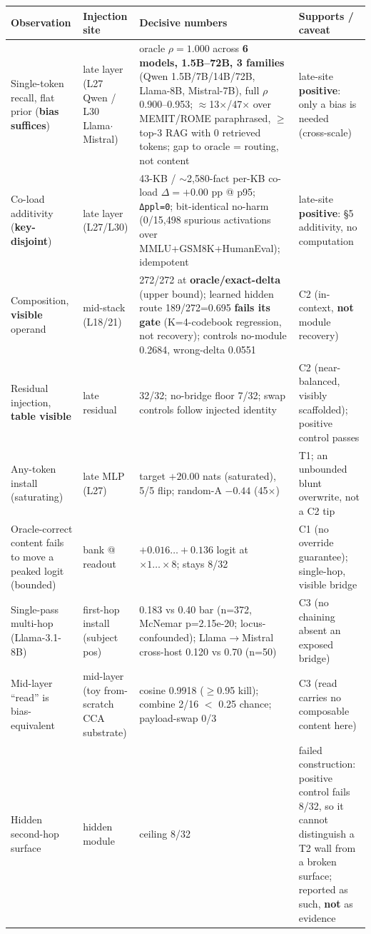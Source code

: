 \documentclass[11pt]{article}
\theoremstyle{plain}
\theoremstyle{definition}
\begin{document}
{\footnotesize
\begin{longtable}{p{2.6cm}p{2.3cm}p{4.8cm}p{2.6cm}}
\toprule
Observation & Injection site & Decisive numbers & Supports / caveat \\
\midrule
\endhead
Single-token recall, flat prior (\textbf{bias suffices}) & late layer (L27 Qwen / L30 Llama$\cdot$Mistral) & oracle $\rho=1.000$ across \textbf{6 models, 1.5B--72B, 3 families} (Qwen 1.5B/7B/14B/72B, Llama-8B, Mistral-7B), full $\rho$ 0.900--0.953; $\approx$13$\times$/47$\times$ over MEMIT/ROME paraphrased, $\ge$ top-3 RAG with 0 retrieved tokens; gap to oracle = routing, not content & late-site \textbf{positive}: only a bias is needed (cross-scale) \\
Co-load additivity (\textbf{key-disjoint}) & late layer (L27/L30) & 43-KB / $\sim$2{,}580-fact per-KB co-load $\Delta=+0.00$ pp @ p95; \texttt{Δppl=0}; bit-identical no-harm (0/15{,}498 spurious activations over MMLU+GSM8K+HumanEval); idempotent & late-site \textbf{positive}: \S5 additivity, no computation \\
Composition, \textbf{visible} operand & mid-stack (L18/21) & 272/272 at \textbf{oracle/exact-delta} (upper bound); learned hidden route 189/272=0.695 \textbf{fails its gate} (K=4-codebook regression, not recovery); controls no-module 0.2684, wrong-delta 0.0551 & C2 (in-context, \textbf{not} module recovery) \\
Residual injection, \textbf{table visible} & late residual & 32/32; no-bridge floor 7/32; swap controls follow injected identity & C2 (near-balanced, visibly scaffolded); positive control passes \\
Any-token install (saturating) & late MLP (L27) & target $+20.00$ nats (saturated), 5/5 flip; random-A $-0.44$ (45$\times$) & T1; an unbounded blunt overwrite, not a C2 tip \\
Oracle-correct content fails to move a peaked logit (bounded) & bank @ readout & $+0.016\dots+0.136$ logit at $\times1\dots\times8$; stays 8/32 & C1 (no override guarantee); single-hop, visible bridge \\
Single-pass multi-hop (Llama-3.1-8B) & first-hop install (subject pos) & 0.183 vs 0.40 bar (n=372, McNemar p=2.15e-20; locus-confounded); Llama$\to$Mistral cross-host 0.120 vs 0.70 (n=50) & C3 (no chaining absent an exposed bridge) \\
Mid-layer ``read'' is bias-equivalent & mid-layer (toy from-scratch CCA substrate) & cosine 0.9918 ($\ge$0.95 kill); combine 2/16 $<$ 0.25 chance; payload-swap 0/3 & C3 (read carries no composable content here) \\
Hidden second-hop surface & hidden module & ceiling 8/32 & failed construction: positive control fails 8/32, so it cannot distinguish a T2 wall from a broken surface; reported as such, \textbf{not} as evidence \\
\bottomrule
\end{longtable}}
\end{document}
